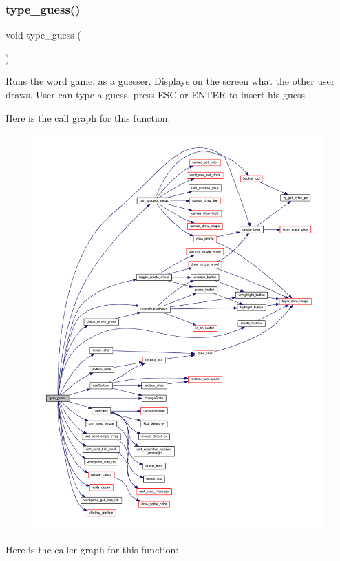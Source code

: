 \subsubsection{\texorpdfstring{type\+\_\+guess()}{type\_guess()}}
{\footnotesize\ttfamily void type\+\_\+guess (\begin{DoxyParamCaption}{ }\end{DoxyParamCaption})}



Runs the word game, as a guesser. Displays on the screen what the other user draws. User can type a guess, press E\+SC or E\+N\+T\+ER to insert his guess. 

Here is the call graph for this function\+:\nopagebreak
\begin{figure}[H]
\begin{center}
\leavevmode
\includegraphics[width=350pt]{group__pengoo_gabe23d2dac0552bf9069a47573770d379_cgraph}
\end{center}
\end{figure}
Here is the caller graph for this function\+:\nopagebreak
